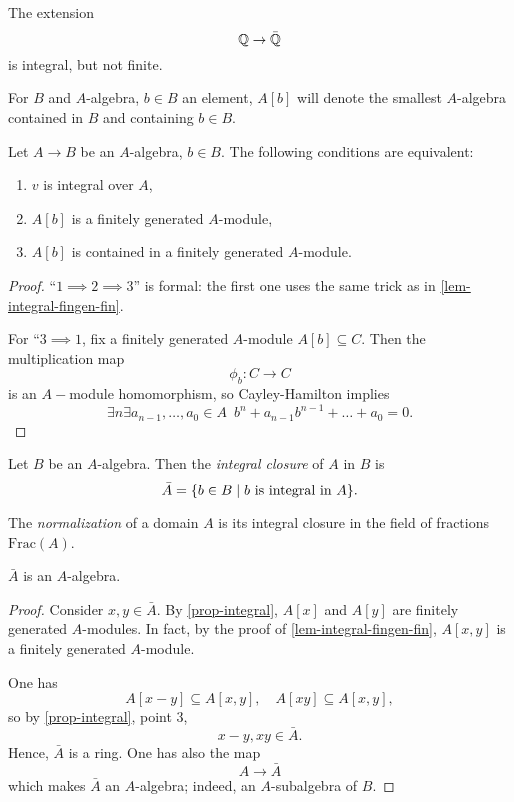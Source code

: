 \begin{example}
  The extension
  \[ \mathbb Q \to \bar {\mathbb Q}\]
  is integral, but not finite.
\end{example}

\begin{df}
  For $B$ and $A$-algebra, $b \in B$ an element, $A[b]$ will denote the smallest $A$-algebra contained in $B$ and containing $b \in B$.
\end{df}

\begin{prop}
  \label{prop-integral}
  Let $A \to B$ be an $A$-algebra, $b \in B$. The following conditions are equivalent:
  \begin{enumerate}
  \item $v$ is integral over $A$,
  \item $A[b]$ is a finitely generated $A$-module,
  \item $A[b]$ is contained in a finitely generated $A$-module.
  \end{enumerate}
\end{prop}
\begin{proof}
  ``$1 \implies 2 \implies 3$'' is formal: the first one uses the same trick as in \cref{lem-integral-fingen-fin}.

  For ``$ 3 \implies 1$, fix a finitely generated $A$-module $A[b] \subseteq C$. Then the multiplication map
  \[ \phi_b \colon C \to C\]
  is an $A-$module homomorphism, so Cayley-Hamilton implies
  \[ \exists n \exists a_{n-1}, \dotsc, a_0 \in A \enspace b^n + a_{n-1} b^{n-1} + \dotso + a_0 = 0.\]
\end{proof}

\begin{df}
  Let $B$ be an $A$-algebra. Then the \textit{integral closure} of $A$ in $B$ is
  \[ \bar A = \{ b \in B \mathrel{|} \text{$b$ is integral in $A$}\}.\]

  The \textit{normalization} of a domain $A$ is its integral closure in the field of fractions $\text{Frac}(A)$.
\end{df}


\begin{corollary}
  $\bar A$ is an $A$-algebra.
\end{corollary}
\begin{proof}
  Consider $x, y \in \bar A$. By \cref{prop-integral}, $A[x]$ and $A[y]$ are finitely generated $A$-modules. In fact, by the proof of \cref{lem-integral-fingen-fin}, $A[x, y]$ is a finitely generated $A$-module.

  One has
  \[ A[x - y] \subseteq A[x,y], \quad A[xy] \subseteq A[x, y],\]
  so by \cref{prop-integral}, point 3,
  \[ x- y, xy \in \bar A.\]
  Hence, $\bar A$ is a ring. One has also the map
  \[ A \to \bar A\]
  which makes $\bar A$ an $A$-algebra; indeed, an $A$-subalgebra of $B$.
\end{proof}

